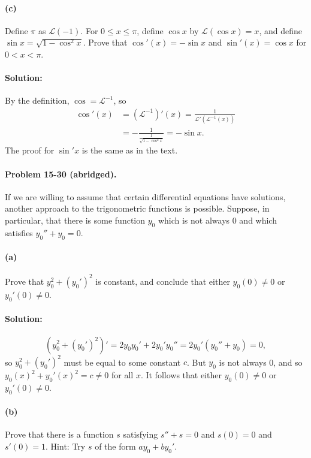 \documentclass{article}
\begin{document}
\paragraph{(c)} Define $\pi$ as $\mathcal{L}(-1)$. For $0 \leq x \leq \pi$,
define $\cos x$ by $\mathcal{L}(\cos x) = x$, and define $\sin x = \sqrt{1 -
\cos^2 x}$. Prove that $\cos'(x) = -\sin x$ and $\sin'(x) = \cos x$ for $0 < x
< \pi$.

\paragraph{Solution:} By the definition, $\cos = \mathcal{L}^{-1}$, so
\begin{align*}
  \cos'(x)
  &= (\mathcal{L}^{-1})'(x) = \frac{1}{\mathcal{L}'(\mathcal{L}^{-1}(x))} \\
  &= -\frac{1}{\frac{1}{\sqrt{1 - \cos^2 x}}} = -\sin x.
\end{align*} The proof for $\sin' x$ is the same as in the text.

\paragraph{Problem 15-30 (abridged).} If we are willing to assume that certain
differential equations have solutions, another approach to the trigonometric
functions is possible. Suppose, in particular, that there is some function
$y_0$ which is not always 0 and which satisfies $y_0'' + y_0 = 0$.

\paragraph{(a)} Prove that $y_0^2 + (y_0')^2$ is constant, and conclude that
either $y_0(0) \neq 0$ or $y_0'(0) \neq 0$.

\paragraph{Solution:} \begin{equation*}
  (y_0^2 + (y_0')^2)' = 2y_0y_0' + 2y_0'y_0'' = 2y_0'(y_0'' + y_0) = 0,
\end{equation*} so $y_0^2 + (y_0')^2$ must be equal to some constant $c$. But
$y_0$ is not always 0, and so $y_0(x)^2 + y_0'(x)^2 = c \neq 0$ for all $x$.
It follows that either $y_0(0) \neq 0$ or $y_0'(0) \neq 0$.

\paragraph{(b)} Prove that there is a function $s$ satisfying $s'' + s = 0$ and
$s(0) = 0$ and $s'(0) = 1$. Hint: Try $s$ of the form $ay_0 + by_0'$.
\end{document}
